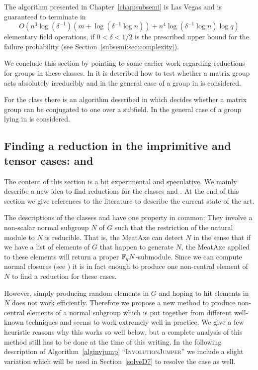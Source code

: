 The algorithm presented in Chapter~\ref{chap:subsemi} is Las Vegas and is
guaranteed to terminate in 
\[ O(n^3\log(\delta^{-1})(m+\log(\delta^{-1} \log n))
   + n^4\log(\delta^{-1} \log n) \log q) \]
elementary field operations,
if $0 < \delta < 1/2$ is the prescribed upper bound for the failure
probability (see Section~\ref{subsemi:sec:complexity}).

We conclude this section by pointing to some earlier work regarding
reductions for groups in these classes. In \cite{MeatAxeHoltRees} it
is described how to test whether a matrix group acts absolutely
irreducibly and in \cite{smashnormal} the general case of a group
in  is considered.

For the class  there is an algorithm described in
\cite{GlasbyHowlett} which decides whether a matrix group can be
conjugated to one over a subfield. In \cite{GLGOB} the general case
of a group lying in  is considered.


\subsection{Finding a reduction in the imprimitive and tensor
cases:  and }
\label{solveD24}

The content of this section is a bit experimental and speculative. We
mainly describe a new idea to find reductions for the classes  and
. At the end of this section we give references to the literature
to describe the current state of the art.

The descriptions of the classes  and  have one property in
common: They involve a non-scalar normal subgroup $N$ of $G$ such
that the restriction of the natural module to $N$ is reducible. That
is, the MeatAxe can detect $N$ in the sense that if we have a list of
elements of $G$ that happen to generate $N$, the MeatAxe applied to
these elements will return a proper $\mathbb{F}_q N$-submodule. Since we can
compute normal closures (see \cite[Theorem~2.3.9]{Ser}) it is in fact
enough to produce one non-central element of $N$ to find a reduction for
these cases.

However, simply producing random elements in $G$ and hoping to hit elements
in $N$ does not work efficiently. Therefore we propose a new method to
produce non-central elements of a normal subgroup which is put together
from different well-known techniques and seems to work extremely well in
practice. We give a few heuristic reasons why this works so well below, but
a complete analysis of this method still has to be done at the time of 
this writing.
In the following description of Algorithm~\ref{alginvjump}
``\textsc{InvolutionJumper}'' we include a
slight variation which will be used in Section~\ref{solveD7} to resolve
the  case as well.

